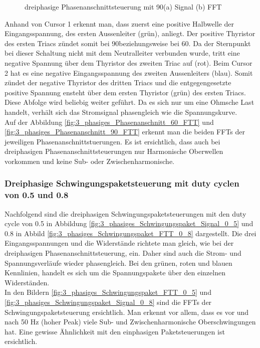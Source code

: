 \begin{figure}[ht!]
	\centering
	\qquad
	\caption{dreiphasige Phasenanschnittsteuerung mit 90\textdegree (a) Signal (b) FFT}
	\label{fig:dreiphasige_Phasenanschnittsteuerung_mit_90}
\end{figure}
Anhand von Cursor 1 erkennt man, dass zuerst eine positive Halbwelle der Eingangsspannung, des ersten Aussenleiter (grün), anliegt. Der positive Thyristor des ersten Triacs zündet somit bei 90\textdegree beziehungsweise bei 60\textdegree. Da der Sternpunkt bei dieser Schaltung nicht mit dem Neutralleiter verbunden wurde, tritt eine negative Spannung über dem Thyristor des zweiten Triac auf (rot). Beim Cursor 2 hat es eine negative Eingangsspannung des zweiten Aussenleiters (blau). Somit zündet der negative Thyristor des dritten Triacs und die entgegengesetzte positive Spannung ensteht über dem ersten Thyristor (grün) des ersten Triacs. Diese Abfolge wird beliebig weiter geführt. Da es sich nur um eine Ohmsche Last handelt, verhält sich das Stromsignal phasengleich wie die Spannungskurve.\\
Auf der Abbildung \ref{fig:3_phasiges_Phasenanschnitt_60_FTT} und \ref{fig:3_phasiges_Phasenanschnitt_90_FTT} erkennt man die beiden  FFTs der jeweiligen Phasenanschnittstuerungen. Es ist ersichtlich, dass auch bei dreiphasigen Phasenanschnittsteuerungen nur Harmonische Oberwellen vorkommen und keine Sub- oder Zwischenharmonische. 

\newpage

\subsubsection{Dreiphasige Schwingungspaketsteuerung mit duty cyclen von 0.5 und 0.8}
Nachfolgend sind die dreiphasigen Schwingungspaketsteuerungen mit den duty cycle von 0.5 in Abbildung \ref{fig:3_phasiges_Schwingungspaket_Signal_0_5} und 0.8 in Abbild \ref{fig:3_phasiges_Schwingungspaket_FTT_0_8} dargestellt. Die drei Eingangsspannungen und die Widerstände richtete man gleich, wie bei der dreiphasigen Phasenanschnittsteuerung, ein. Daher sind auch die Strom- und Spannungsverläufe wieder phasengleich. Bei den grünen, roten und blauen Kennlinien, handelt es sich um die Spannungspakete über den einzelnen Widerständen.\\
In den Bildern \ref{fig:3_phasiges_Schwingungspaket_FTT_0_5} und \ref{fig:3_phasiges_Schwingungspaket_Signal_0_8} sind die FFTs der Schwingungspaketsteuerung ersichtlich. Man erkennt vor allem, dass es vor und nach 50 Hz (hoher Peak) viele Sub- und Zwischenharmonische Oberschwingungen hat. Eine gewisse Ähnlichkeit mit den einphasigen Paketsteuerungen ist ersichtlich.
 

